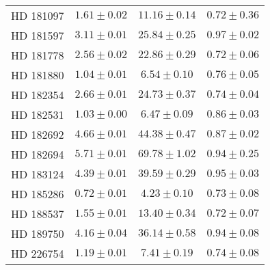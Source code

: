 \begin{table}
\begin{tabular}{cccc}
HD 181097 & $1.61 \pm 0.02$ & $11.16 \pm 0.14$ & $0.72 \pm 0.36$ \\
HD 181597 & $3.11 \pm 0.01$ & $25.84 \pm 0.25$ & $0.97 \pm 0.02$ \\
HD 181778 & $2.56 \pm 0.02$ & $22.86 \pm 0.29$ & $0.72 \pm 0.06$ \\
HD 181880 & $1.04 \pm 0.01$ & $6.54 \pm 0.10$ & $0.76 \pm 0.05$ \\
HD 182354 & $2.66 \pm 0.01$ & $24.73 \pm 0.37$ & $0.74 \pm 0.04$ \\
HD 182531 & $1.03 \pm 0.00$ & $6.47 \pm 0.09$ & $0.86 \pm 0.03$ \\
HD 182692 & $4.66 \pm 0.01$ & $44.38 \pm 0.47$ & $0.87 \pm 0.02$ \\
HD 182694 & $5.71 \pm 0.01$ & $69.78 \pm 1.02$ & $0.94 \pm 0.25$ \\
HD 183124 & $4.39 \pm 0.01$ & $39.59 \pm 0.29$ & $0.95 \pm 0.03$ \\
HD 185286 & $0.72 \pm 0.01$ & $4.23 \pm 0.10$ & $0.73 \pm 0.08$ \\
HD 188537 & $1.55 \pm 0.01$ & $13.40 \pm 0.34$ & $0.72 \pm 0.07$ \\
HD 189750 & $4.16 \pm 0.04$ & $36.14 \pm 0.58$ & $0.94 \pm 0.08$ \\
HD 226754 & $1.19 \pm 0.01$ & $7.41 \pm 0.19$ & $0.74 \pm 0.08$ \\
\hline
\end{tabular}
\end{table}
